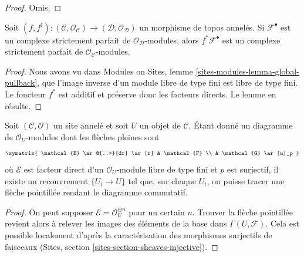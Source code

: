 \begin{proof}
Omis.
\end{proof}

\begin{lemma}
\label{lemma-strictly-perfect-pullback}
Soit $(f, f^\sharp) : (\mathcal{C}, \mathcal{O}_\mathcal{C}) \to
(\mathcal{D}, \mathcal{O}_\mathcal{D})$
un morphisme de topos annelés. Si $\mathcal{F}^\bullet$ est un complexe
strictement parfait de $\mathcal{O}_\mathcal{D}$-modules, alors
$f^*\mathcal{F}^\bullet$ est un complexe strictement parfait de
$\mathcal{O}_\mathcal{C}$-modules.
\end{lemma}

\begin{proof}
Nous avons vu dans Modules on Sites, lemme
\ref{sites-modules-lemma-global-pullback}, que l'image inverse d'un module
libre de type fini est libre de type fini. Le foncteur $f^*$ est additif et
préserve donc les facteurs directs. Le lemme en résulte.
\end{proof}

\begin{lemma}
\label{lemma-local-lift-map}
Soit $(\mathcal{C}, \mathcal{O})$ un site annelé et soit $U$ un objet de
$\mathcal{C}$. Étant donné un diagramme de $\mathcal{O}_U$-modules dont les
flèches pleines sont
$$
\xymatrix{
\mathcal{E} \ar@{..>}[dr] \ar[r] & \mathcal{F} \\
& \mathcal{G} \ar[u]_p
}
$$
où $\mathcal{E}$ est facteur direct d'un $\mathcal{O}_U$-module libre de type
fini et $p$ est surjectif, il existe un recouvrement $\{U_i \to U\}$ tel que,
sur chaque $U_i$, on puisse tracer une flèche pointillée rendant le diagramme
commutatif.
\end{lemma}

\begin{proof}
On peut supposer $\mathcal{E} = \mathcal{O}_U^{\oplus n}$ pour un certain $n$.
Trouver la flèche pointillée revient alors à relever les images des éléments
de la base dans $\Gamma(U, \mathcal{F})$. Cela est possible localement d'après
la caractérisation des morphismes surjectifs de faisceaux (Sites, section
\ref{sites-section-sheaves-injective}).
\end{proof}


